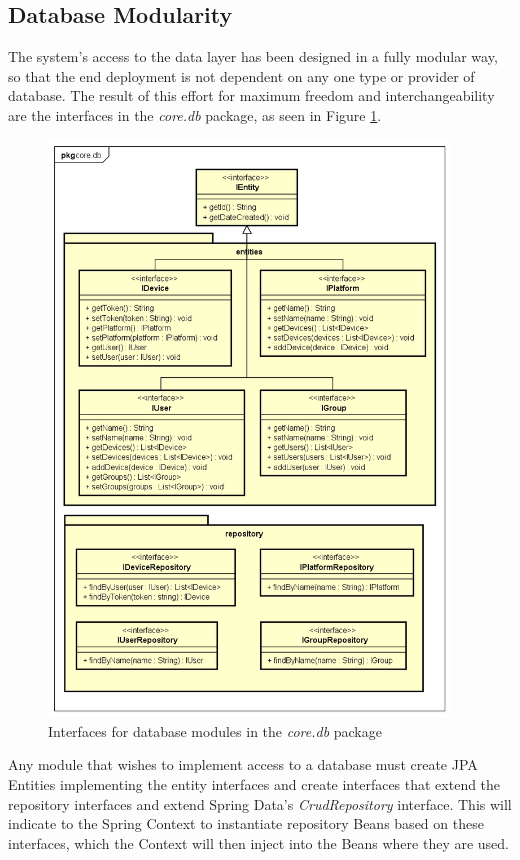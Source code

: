 \subsection{Database Modularity} \label{design:database-modularity}
The system's access to the data layer has been designed in a fully modular way, so that the end deployment is not dependent on any one type or provider of database. The result of this effort for maximum freedom and interchangeability are the interfaces in the \textit{core.db} package, as seen in Figure \ref{fig:core-db-module}.

\begin{figure}[!ht]
	\centering
	\includegraphics[width=0.95\textwidth]{figures/03_design/core-db-module}
    \caption{Interfaces for database modules in the \textit{core.db} package}
    \label{fig:core-db-module}
\end{figure}

Any module that wishes to implement access to a database must create JPA Entities implementing the entity interfaces and create interfaces that extend the repository interfaces and extend Spring Data's \textit{CrudRepository} interface. This will indicate to the Spring Context to instantiate repository Beans based on these interfaces\cite{spring-repos}, which the Context will then inject into the Beans where they are used.

